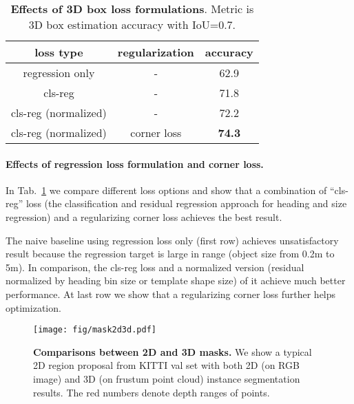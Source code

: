 \documentclass[10pt,twocolumn,letterpaper]{article}
\begin{document}
\begin{table}[t!]
\small
\centering
\begin{tabular}{c|c|c}
\hline
loss type & regularization & accuracy \\ \hline
regression only & - & 62.9 \\ \hline
cls-reg & - & 71.8    \\ 
cls-reg (normalized) & - & 72.2    \\ \hline
cls-reg (normalized)  & corner loss & \textbf{74.3}  \\ \hline
\end{tabular}
\caption{\textbf{Effects of 3D box loss formulations}. Metric is 3D box estimation accuracy with IoU=0.7.}
\label{tab:corner_loss}

\end{table}

\vspace{-.15in}
\paragraph{Effects of regression loss formulation and corner loss.} In Tab.~\ref{tab:corner_loss} we compare different loss options and show that a combination of ``cls-reg'' loss (the classification and residual regression approach for heading and size regression) and a regularizing corner loss achieves the best result.

The naive baseline using regression loss only (first row) achieves unsatisfactory result because the regression target is large in range (object size from 0.2m to 5m). In comparison, the cls-reg loss and a normalized version (residual normalized by heading bin size or template shape size) of it achieve much better performance. At last row we show that a regularizing corner loss further helps optimization.


\begin{figure}[t!]
    \centering
    \texttt{[image: fig/mask2d3d.pdf]}
    \caption{\textbf{Comparisons between 2D and 3D masks.} We show a typical 2D region proposal from KITTI val set with both 2D (on RGB image) and 3D (on frustum point cloud) instance segmentation results. The red numbers denote depth ranges of points.}
    \label{fig:mask2d3d}
\end{figure}
\end{document}
